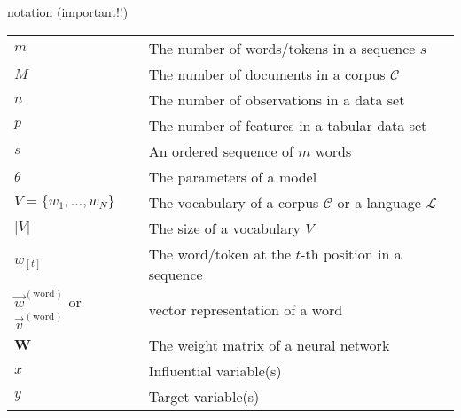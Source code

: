 \begin{vbframe}{notation (important!!)}

\vfill

\begin{tabular}{ll}
        $m$ & The number of words/tokens in a sequence $s$\\[.5em]
        $M$ & The number of documents in a corpus $\mathcal{C}$\\[.5em]
        $n$ & The number of observations in a data set\\[.5em]
        $p$ & The number of features in a tabular data set\\[.5em]
        $s$ & An ordered sequence of $m$ words\\[.5em]
        $\theta$ & The parameters of a model\\[.5em]
        $V = \{ w_1, \hdots, w_N \}$ & The vocabulary of a corpus $\mathcal{C}$ or a language $\mathcal{L}$\\[.5em]
        $|V|$ & The size of a vocabulary $V$\\[.5em]
        $w_{\left[t\right]}$ & The word/token at the $t$-th position in a sequence\\[.5em]
				$\vec w^{({\text{word}})}$ or $\vec v^{({\text{word}})}$ & vector representation of a word\\[.5em]
        $\mathbf{W}$ & The weight matrix of a neural network\\[.5em]
        $x$ & Influential variable(s)\\[.5em]
        $y$ & Target variable(s)\\[.5em]
\end{tabular}

\vfill

\end{vbframe}